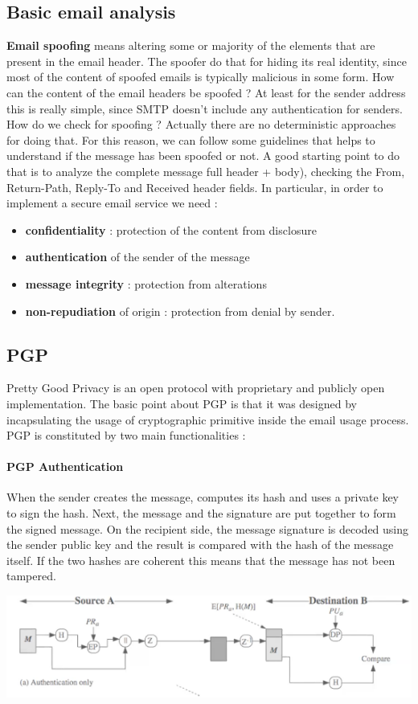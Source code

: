 \subsection{Basic email analysis}
\textbf{Email spoofing} means altering some or majority of the elements that are present in the email header. The spoofer do that for hiding its real identity, since most of the content of spoofed emails is typically malicious in some form. How can the content of the email headers be spoofed ? At least for the sender address this is really simple, since SMTP doesn't include any authentication for senders. How do we check for spoofing ? Actually there are no deterministic approaches for doing that. For this reason, we can follow some guidelines that helps to understand if the message has been spoofed or not. A good starting point to do that is to analyze the complete message full header + body), checking the From, Return-Path, Reply-To and Received header fields. In particular, in order to implement a secure email service we need :
\begin{itemize}
\item \textbf{confidentiality} : protection of the content from disclosure
\item \textbf{authentication} of the sender of the message
\item \textbf{message integrity} : protection from alterations
\item \textbf{non-repudiation} of origin : protection from denial by sender. 
\end{itemize}
\subsection{PGP}
Pretty Good Privacy is an open protocol with proprietary and publicly open implementation. The basic point about PGP is that it was designed by incapsulating the usage of cryptographic primitive inside the email usage process. PGP is constituted by two main functionalities :

\paragraph{PGP Authentication} When the sender creates the message, computes its hash and uses a private key to sign the hash. Next, the message and the signature are put together to form the signed message. On the recipient side, the message signature is decoded using the sender public key and the result is compared with the hash of the message itself. If the two hashes are coherent this means that the message has not been tampered.
\begin{center}
\includegraphics[scale=0.5]{./images/pgp_authentication.png}
\end{center}

